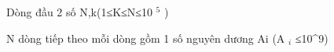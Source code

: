 Dòng đầu 2 số N,k(1≤K≤N≤10   $^    5   $   )  

   N dòng tiếp theo mỗi dòng gồm 1 số nguyên dương Ai (A   $_    i   $   ≤10^9)  

\